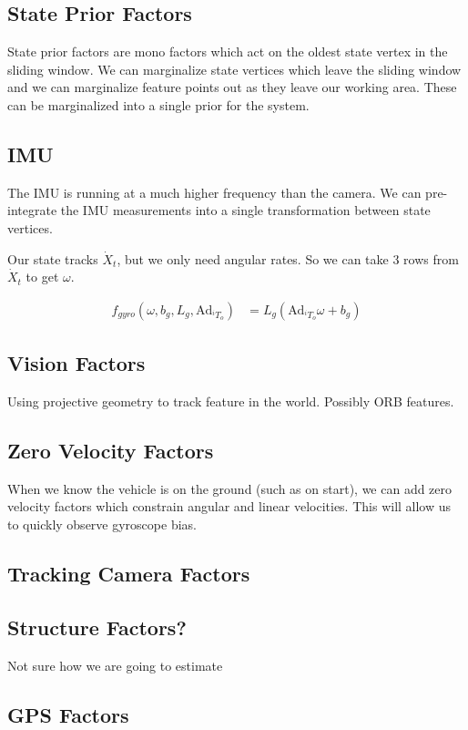 \documentclass[11pt]{article}
\newcommand{\pose}[2]{{}^{#1}T_{#2}}
\begin{document}
\subsection{State Prior Factors}
State prior factors are mono factors which act on the oldest state vertex in the sliding window. We can marginalize state vertices which leave the sliding window and we can marginalize feature points out as they leave our working area. These can be marginalized into a single prior for the system.

\subsection{IMU}
The IMU is running at a much higher frequency than the camera. We can pre-integrate the IMU measurements into a single transformation between state vertices.

Our state tracks $\dot X_t$, but we only need angular rates. So we can take 3 rows from $\dot X_t$ to get $\omega$.

\begin{align}
	f_{gyro} (\omega, b_g, L_g, \text{Ad}_{\pose{i}{o}}) &= L_g \left(\text{Ad}_{\pose{i}{o}}\omega + b_g\right)
\end{align}

\subsection{Vision Factors}
Using projective geometry to track feature in the world. Possibly ORB features.

\subsection{Zero Velocity Factors} 
When we know the vehicle is on the ground (such as on start), we can add zero velocity factors which constrain angular and linear velocities. This will allow us to quickly observe gyroscope bias.

\subsection{Tracking Camera Factors}

\subsection{Structure Factors?}
Not sure how we are going to estimate 

\subsection{GPS Factors}
\end{document}
